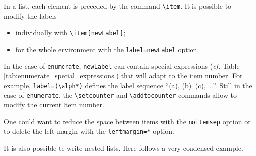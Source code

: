 \documentclass[12pt]{report}
\def\tbs{\textbackslash}
\begin{document}
    In a list, each element is preceded by the command \texttt{\tbs{}item}. It is possible to modify the labels
    \begin{itemize}
        \item individually with \texttt{\tbs{}item[newLabel]};
        \item for the whole environment with the \texttt{label=newLabel} option.
    \end{itemize}

    In the case of \texttt{enumerate}, \texttt{newLabel} can contain special expressions (\emph{cf.} Table \ref{tab:enumerate_special_expressions}) that will adapt to the item number. For example, \texttt{label=(\tbs{}alph*)} defines the label sequence \enquote{(a), (b), (c), ...}. Still in the case of \texttt{enumerate}, the  \texttt{\tbs{}setcounter} and \texttt{\tbs{}addtocounter} commands allow to modify the current item number.

    One could want to reduce the space between items with the \texttt{noitemsep} option or to delete the left margin with the \texttt{leftmargin=*} option.

    It is also possible to write nested lists. Here follows a very condensed example.
\end{document}
